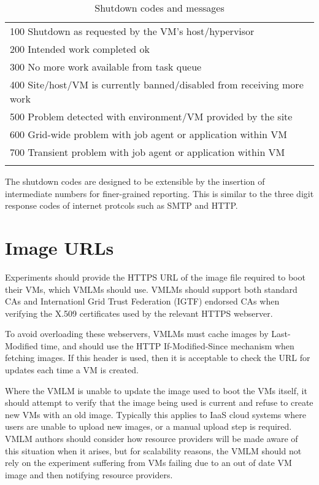 \documentclass[12pt,a4paper]{article}
\begin{document}
\begin{center}
\begin{table}[H]
\label{table:shutdowncodes}
\begin{center}
\begin{tabular}{l}
\\
100 Shutdown as requested by the VM's host/hypervisor \\
200 Intended work completed ok \\
300 No more work available from task queue \\
400 Site/host/VM is currently banned/disabled from receiving more work \\
500 Problem detected with environment/VM provided by the site \\
600 Grid-wide problem with job agent or application within VM \\
700 Transient problem with job agent or application within VM \\
\\
\end{tabular}
\caption{\label{opt}Shutdown codes and messages}
\end{center}
\end{table}
\end{center}

The shutdown codes are designed to be extensible by the insertion of 
intermediate numbers for finer-grained reporting. This is similar to the
three digit response codes of internet protcols such as SMTP and HTTP.

\section{Image URLs}
\label{sec:imageurls}

Experiments should provide the HTTPS URL of the image file required to boot
their VMs, which VMLMs should use. VMLMs should support both standard CAs
and Internationl Grid Trust Federation (IGTF) endorsed CAs when verifying
the X.509 certificates used by the relevant HTTPS webserver.

To avoid overloading these webservers, VMLMs must cache images by 
Last-Modified time, and should use the HTTP If-Modified-Since mechanism
when fetching images. If this header is used, then it is acceptable to
check the URL for updates each time a VM is created.

Where the VMLM is unable to update the image used to boot the VMs itself, 
it should attempt to verify that the image being used is current and refuse
to create new VMs with an old image. Typically this applies to IaaS cloud
systems where users are unable to upload new images, or a manual upload step
is required. VMLM authors should consider how resource providers will be
made aware of this situation when it arises, but for scalability reasons,
the VMLM should not rely on the experiment suffering from VMs failing 
due to an out of date VM image and then notifying resource providers.
\end{document}
